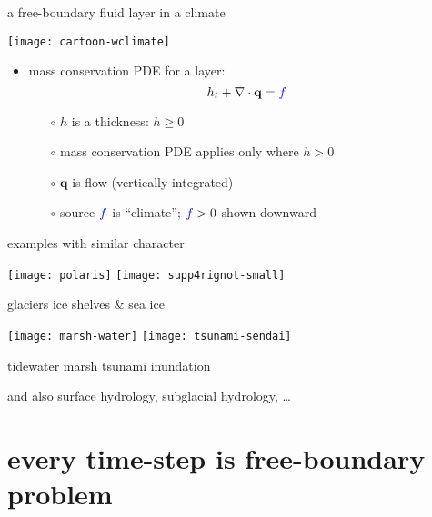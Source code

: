 \documentclass{beamer}
\newcommand\bq{\mathbf{q}}
\newcommand\Div{\nabla\cdot}
\begin{document}
\begin{frame}{a free-boundary fluid layer in a climate}

\begin{center}
\texttt{[image: cartoon-wclimate]}
\end{center}

\vspace{-7mm}
  \begin{itemize}
  \item mass conservation PDE for a layer:
      $$h_t + \Div\bq = {\color{blue} f}$$
    \begin{itemize}
    \vspace{-4mm}
    \item[$\circ$] $h$ is a thickness: $h\ge 0$
    \item[$\circ$] mass conservation PDE applies only where $h>0$
    \item[$\circ$] $\bq$ is flow (vertically-integrated)
    \item[$\circ$] source ${\color{blue} f}$ is ``climate''; ${\color{blue} f}>0$ shown downward
    \end{itemize}
  \end{itemize}
\end{frame}


\begin{frame}{examples with similar character}

\texttt{[image: polaris]}
\hfill
\texttt{[image: supp4rignot-small]}

\small glaciers \hfill ice shelves \& sea ice

\medskip
\texttt{[image: marsh-water]}
\hfill
\texttt{[image: tsunami-sendai]}

\small tidewater marsh \hfill tsunami inundation

\medskip
\scriptsize and also surface hydrology, subglacial hydrology, \dots
\end{frame}


\section{every time-step is free-boundary problem}
\end{document}
